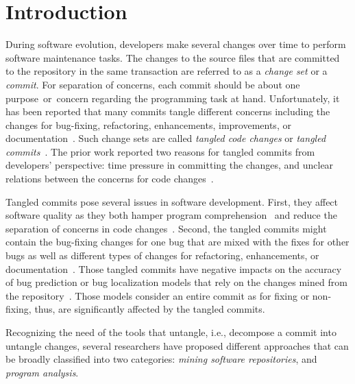 \section{Introduction}
\label{intro:sec}

During software evolution, developers make several changes over time
to perform software maintenance tasks. The changes to the
source files that are committed to the repository in the same
transaction are referred to as a {\em change set} or a {\em
  commit}. For separation of concerns, each commit should be about one
purpose~or~concern regarding the programming task at hand.
Unfortunately, it has been reported that many commits tangle different
concerns including the changes for bug-fixing, refactoring,
enhancements, improvements, or
documentation~\cite{tao-fse12,kim-emse16,kim-msr13,hill-tse12,nguyen-issre13}.
Such change sets are called {\em tangled code changes} or {\em tangled
  commits}~\cite{kim-emse16,kim-msr13}. The prior work reported two
reasons for tangled commits from developers' perspective: time
pressure in committing the changes, and unclear relations between the
concerns for code changes~\cite{flexeme-fse20}.

Tangled commits pose several issues in software development. First,
they affect software quality as they both hamper program
comprehension~\cite{tao-fse12} and reduce the separation of concerns
in code changes~\cite{flexeme-fse20}. Second, the tangled commits
might contain the bug-fixing changes for one bug that are mixed with
the fixes for other bugs as well as different types of changes for
refactoring, enhancements, or
documentation~\cite{kim-emse16,kim-msr13,nguyen-issre13}. Those
tangled commits have negative impacts on the accuracy of bug
prediction or bug localization models that rely on the changes mined from
the repository~\cite{kim-emse16,kim-msr13}. Those models
consider an entire commit as for fixing or non-fixing, thus, are
significantly affected by the tangled commits.

Recognizing the need of the tools that untangle, i.e., decompose a
commit into untangle changes, several researchers have proposed
different approaches that can be broadly classified into two
categories: {\em mining software repositories}, and {\em program
  analysis}.

